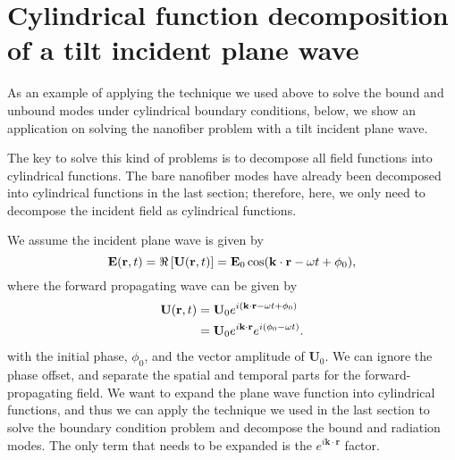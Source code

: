 \chapter{Cylindrical function decomposition of a tilt incident plane wave}\label{Ch:PlanewaveDecomposition}
As an example of applying the technique we used above to solve the bound and unbound modes under cylindrical boundary conditions, below, we show an application on solving the nanofiber problem with a tilt incident plane wave. 

The key to solve this kind of problems is to decompose all field functions into cylindrical functions. The bare nanofiber modes have already been decomposed into cylindrical functions in the last section; therefore, here, we only need to decompose the incident field as cylindrical functions. 

We assume the incident plane wave is given by
\begin{equation}
\mathbf{E}(\mathbf{r},t)=\Re\left[\mathbf{U}(\mathbf{r},t) \right]=\mathbf{E}_0 \cos (\mathbf{k}\cdot\mathbf{r}-\omega t + \phi_0),
\end{equation}
where the forward propagating wave can be given by
\begin{align}
\mathbf{U}(\mathbf{r},t) &= \mathbf{U}_0e^{i(\mathbf{k}\cdot\mathbf{r}-\omega t + \phi_0)}\\
&= \mathbf{U}_0e^{i\mathbf{k}\cdot\mathbf{r}}e^{i(\phi_0-\omega t )}.
\end{align}
with the initial phase, $\phi_0$, and the vector amplitude of $\mathbf{U}_0$. We can ignore the phase offset, and separate the spatial and temporal parts for the forward-propagating field. We want to expand the plane wave function into cylindrical functions, and thus we can apply the technique we used in the last section to solve the boundary condition problem and decompose the bound and radiation modes. The only term that needs to be expanded is the $ e^{i\mathbf{k}\cdot\mathbf{r}} $ factor. 


